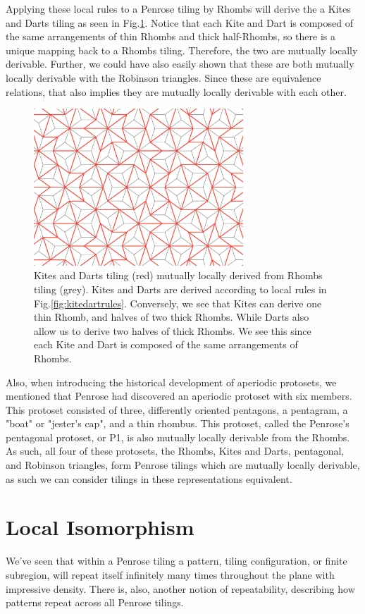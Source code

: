 \documentclass[
  oneside,
  11pt, a4paper,
  footinclude=true,
  headinclude=true,
  cleardoublepage=empty
]{scrbook}
\begin{document}
Applying these local rules to a Penrose tiling by Rhombs will derive the a Kites and Darts tiling as seen in Fig.\ref{fig:KiteRules}. Notice that each Kite and Dart is composed of the same arrangements of thin Rhombs and thick half-Rhombs, so there is a unique mapping back to a Rhombs tiling. Therefore, the two are mutually locally derivable. Further, we could have also easily shown that these are both mutually locally derivable with the Robinson triangles. Since these are equivalence relations, that also implies they are mutually locally derivable with each other.

\begin{figure}
\centering
\includegraphics[width=0.7\textwidth]{KiteRules}
\caption[Kites and Darts from Rhombs]{Kites and Darts tiling (red) mutually locally derived from Rhombs tiling (grey). Kites and Darts are derived according to local rules in Fig.\ref{fig:kitedartrules}. Conversely, we see that Kites can derive one thin Rhomb, and halves of two thick Rhombs. While Darts also allow us to derive two halves of thick Rhombs. We see this since each Kite and Dart is composed of the same arrangements of Rhombs.}
\label{fig:KiteRules}
\end{figure}

Also, when introducing the historical development of aperiodic protosets, we mentioned that Penrose had discovered an aperiodic protoset with six members. This protoset consisted of three, differently oriented pentagons, a pentagram, a "boat" or "jester's cap", and a thin rhombus. This protoset, called the Penrose's pentagonal protoset, or P1, is also mutually locally derivable from the Rhombs. As such, all four of these protosets, the Rhombs, Kites and Darts, pentagonal, and Robinson triangles, form Penrose tilings which are mutually locally derivable, as such we can consider tilings in these representations equivalent. 
\section{Local Isomorphism}
 We've seen that within a Penrose tiling a pattern, tiling configuration, or finite subregion, will repeat itself infinitely many times throughout the plane with impressive density. There is, also, another notion of repeatability, describing how patterns repeat across all Penrose tilings.
 
\end{document}

